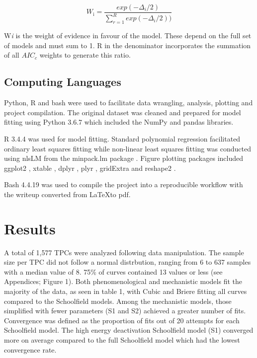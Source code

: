\documentclass[11pt]{article}
\begin{document}
\begin{linenumbers}
\begin{equation}
W_{\text{i}} = \frac{exp(-\Delta_i/2)}{\sum_{r = 1}^{R} exp(-\Delta_i/2))}\tag{9}
\end{equation}

W\textit{i} is the weight of evidence in favour of the model. These depend on the full set of models and must sum to 1. R in the denominator incorporates the summation of all \(AIC_c\) weights to generate this ratio.

\subsection{Computing Languages}
Python, R and bash were used to facilitate data wrangling, analysis, plotting and project compilation. The original dataset was cleaned and prepared for model fitting using Python 3.6.7 which included the NumPy \cite{numpy} and pandas \cite{Mckinney2011} libraries.

R 3.4.4 \cite{R} was used for model fitting. Standard polynomial regression facilitated ordinary least squares fitting while non-linear least squares fitting was conducted using nlsLM from the minpack.lm package \cite{minpack}. Figure plotting packages included ggplot2 \cite{ggplot2}, xtable \cite{xtable}, dplyr \cite{dplyr}, plyr \cite{plyr}, gridExtra \cite{gridextra} and reshape2 \cite{reshape2}.

Bash 4.4.19 was used to compile the project into a reproducible workflow with the writeup converted from \LaTeX to pdf.

 

\section{Results}
A total of 1,577 TPCs were analyzed following data manipulation. The sample size per TPC did not follow a normal distrbution, ranging from 6 to 637 samples with a median value of 8. 75\% of curves contained 13 values or less (see Appendices; Figure 1). Both phenomenological and mechanistic models fit the majority of the data, as seen in table 1, with Cubic and Briere fitting all curves compared to the Schoolfield models. Among the mechanistic models, those simplified with fewer parameters (S1 and S2) achieved a greater number of fits. Convergence was defined as the proportion of fits out of 20 attempts for each Schoolfield model. The high energy deactivation Schoolfield model (S1) converged more on average compared to the full Schoolfield model which had the lowest convergence rate.\\


\end{linenumbers}
\end{document}
